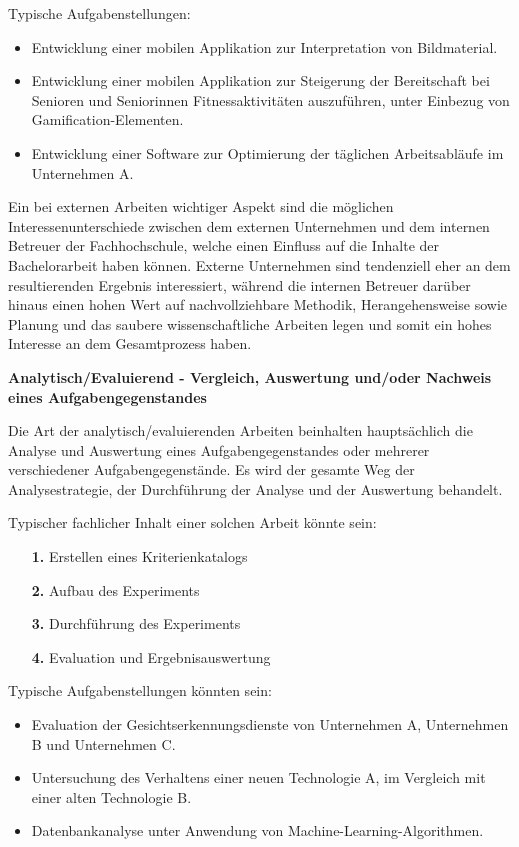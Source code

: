 \documentclass[bibliography=totoc,listof=totoc,BCOR=5mm,DIV=12,oneside]{scrbook}
\begin{document}
\par \bigskip Typische Aufgabenstellungen:
\begin{itemize}
\item Entwicklung einer mobilen Applikation zur Interpretation von Bildmaterial.
\item Entwicklung einer mobilen Applikation zur Steigerung der Bereitschaft bei Senioren und Seniorinnen Fitnessaktivitäten auszuführen, unter Einbezug von  Gamification-Elementen.
\item Entwicklung einer Software zur Optimierung der täglichen Arbeitsabläufe im Unternehmen A.
\end{itemize}

\par \bigskip Ein bei externen Arbeiten wichtiger Aspekt sind die möglichen Interessenunterschiede zwischen dem externen Unternehmen und dem internen Betreuer der Fachhochschule, welche einen Einfluss auf die Inhalte der Bachelorarbeit haben können. Externe Unternehmen sind tendenziell eher an dem resultierenden Ergebnis interessiert, während die internen Betreuer darüber hinaus einen hohen Wert auf nachvollziehbare Methodik, Herangehensweise sowie Planung und das saubere wissenschaftliche Arbeiten legen und somit ein  hohes Interesse an dem Gesamtprozess haben.

\newpage
\par \bigskip \textbf{Analytisch/Evaluierend - Vergleich, Auswertung und/oder Nachweis eines Aufgabengegenstandes}
\par \medskip Die Art der analytisch/evaluierenden Arbeiten beinhalten hauptsächlich die Analyse und Auswertung eines Aufgabengegenstandes oder mehrerer verschiedener Aufgabengegenstände. Es wird der gesamte Weg der Analysestrategie, der Durchführung der Analyse und der Auswertung behandelt.
\par \medskip Typischer fachlicher Inhalt einer solchen Arbeit könnte sein:
\begin{itemize}
\item[\textbf{1.}] Erstellen eines Kriterienkatalogs
\item[\textbf{2.}] Aufbau des Experiments
\item[\textbf{3.}] Durchführung des Experiments
\item[\textbf{4.}] Evaluation und Ergebnisauswertung
\end{itemize}

\par \medskip Typische Aufgabenstellungen könnten sein:
\begin{itemize}
\item Evaluation der Gesichtserkennungsdienste von Unternehmen A, Unternehmen B und Unternehmen C.
\item Untersuchung des Verhaltens einer neuen Technologie A, im Vergleich mit einer alten Technologie B.
\item Datenbankanalyse unter Anwendung von Machine-Learning-Algorithmen.
\end{itemize}
\end{document}
